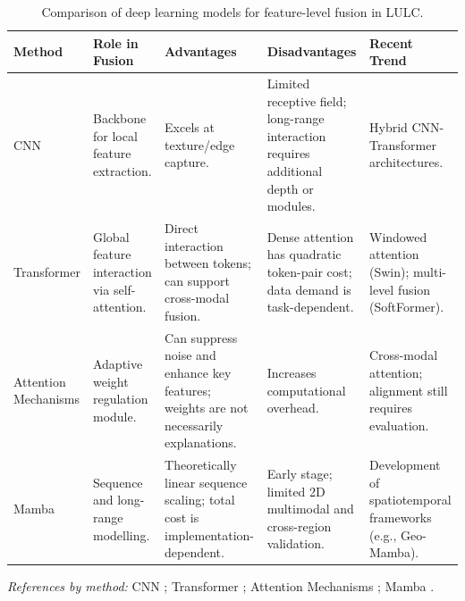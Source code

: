 \documentclass[]{interact}
\theoremstyle{plain}%
\theoremstyle{definition}
\theoremstyle{remark}
\begin{document}
\begin{table}[htb!]
	\centering
	\setlength{\belowcaptionskip}{5pt}
	\caption{Comparison of deep learning models for feature-level fusion in LULC.}
	\label{tab:comparison_models}
	\scriptsize
	\setlength{\tabcolsep}{2pt}
	\renewcommand{\arraystretch}{1.4} %
	\begin{tabular}{@{} >{\raggedright\arraybackslash}p{1.9cm} >{\raggedright\arraybackslash}p{2.25cm} >{\raggedright\arraybackslash}p{2.8cm} >{\raggedright\arraybackslash}p{3.0cm} >{\raggedright\arraybackslash}p{3.0cm} @{}}
		\toprule
		\textbf{Method} & \textbf{Role in Fusion} & \textbf{Advantages} & \textbf{Disadvantages} & \textbf{Recent Trend} \\ 
		\midrule
		CNN & Backbone for local feature extraction. & Excels at texture/edge capture. & Limited receptive field; long-range interaction requires additional depth or modules. & Hybrid CNN-Transformer architectures. \\ 
		\addlinespace[0.8em] %
		
		Transformer & Global feature interaction via self-attention. & Direct interaction between tokens; can support cross-modal fusion. & Dense attention has quadratic token-pair cost; data demand is task-dependent. & Windowed attention (Swin); multi-level fusion (SoftFormer). \\ 
		\addlinespace[0.8em]
		
		Attention Mechanisms & Adaptive weight regulation module. & Can suppress noise and enhance key features; weights are not necessarily explanations. & Increases computational overhead. & Cross-modal attention; alignment still requires evaluation. \\ 
		\addlinespace[0.8em]
		
		Mamba & Sequence and long-range modelling. & Theoretically linear sequence scaling; total cost is implementation-dependent. & Early stage; limited 2D multimodal and cross-region validation. & Development of spatiotemporal frameworks (e.g., Geo-Mamba). \\ 
		\bottomrule
	\end{tabular}
\par\smallskip\begin{minipage}{0.98\textwidth}\scriptsize\textit{References by method:} CNN \citep{2, 8, 29, 56}; Transformer \citep{7, 35, 36, bazi2021vision, liu2024softformer}; Attention Mechanisms \citep{46, 47, zhang2023multimodal}; Mamba \citep{5,49,53}.\end{minipage}
\end{table}
\FloatBarrier
\end{document}
